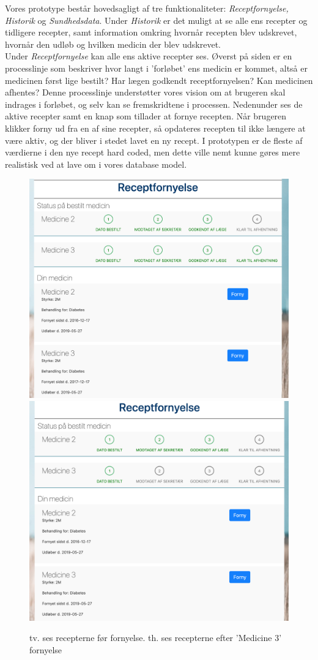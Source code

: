 Vores prototype består hovedsagligt af tre funktionaliteter: \textit{Receptfornyelse, Historik} og \textit{Sundhedsdata}. Under \textit{Historik} er det muligt at se alle ens recepter og tidligere recepter, samt information omkring hvornår recepten blev udskrevet, hvornår den udløb og hvilken medicin der blev udskrevet.\\
Under \textit{Receptfornyelse} kan alle ens aktive recepter ses. Øverst på siden er en processlinje som beskriver hvor langt i 'forløbet' ens medicin er kommet, altså er medicinen først lige bestilt? Har lægen godkendt receptfornyelsen? Kan medicinen afhentes? Denne processlinje understøtter vores vision om at brugeren skal indrages i forløbet, og selv kan se fremskridtene i processen. Nedenunder ses de aktive recepter samt en knap som tillader at fornye recepten. Når brugeren klikker forny ud fra en af sine recepter, så opdateres recepten til ikke længere at være aktiv, og der bliver i stedet lavet en ny recept. I prototypen er de fleste af værdierne i den nye recept hard coded, men dette ville nemt kunne gøres mere realistisk ved at lave om i vores database model.
\begin{figure}[h!]
	\includegraphics[width=0.49\linewidth]{Materials/Prototype/Receptfornyelse}
	\includegraphics[width=0.49\linewidth]{Materials/Prototype/ReceptfornyelseFornyet}
	\caption{tv. ses recepterne før fornyelse. th. ses recepterne efter 'Medicine 3' fornyelse}
\end{figure}

